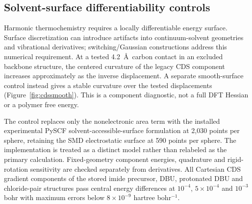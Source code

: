 \documentclass[11pt]{article}
\begin{document}
\subsection{Solvent-surface differentiability controls}
Harmonic thermochemistry requires a locally differentiable energy surface. Surface discretization can introduce artifacts into continuum-solvent geometries and vibrational derivatives; switching/Gaussian constructions address this numerical requirement.\cite{langeherbert2010} At a tested 4.2~\AA\ carbon contact in an excluded backbone structure, the centered curvature of the legacy CDS component increases approximately as the inverse displacement. A separate smooth-surface control instead gives a stable curvature over the tested displacements (Figure~\ref{fig:cdssmooth}). This is a component diagnostic, not a full DFT Hessian or a polymer free energy.

The control replaces only the nonelectronic area term with the installed experimental PySCF solvent-accessible-surface formulation at 2,030 points per sphere, retaining the SMD electrostatic surface at 590 points per sphere. The implementation is treated as a distinct model rather than relabeled as the primary calculation. Fixed-geometry component energies, quadrature and rigid-rotation sensitivity are checked separately from derivatives. All Cartesian CDS gradient components of the stored imide precursor, DBU, protonated DBU and chloride-pair structures pass central energy differences at $10^{-4}$, $5\times10^{-4}$ and $10^{-3}$ bohr with maximum errors below $8\times10^{-9}$ hartree bohr$^{-1}$.
\end{document}
